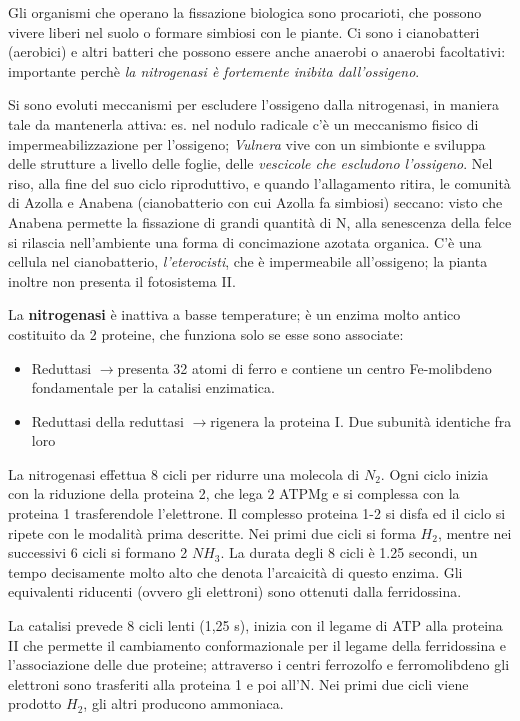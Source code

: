 \documentclass[a4paper,12pt]{book}
\newcommand{\lfreccia}{\ensuremath{\longrightarrow}}
\begin{document}
Gli organismi che operano la fissazione biologica sono procarioti, che possono vivere liberi nel suolo o formare simbiosi con le piante. Ci sono i cianobatteri (aerobici) e altri batteri che possono essere anche anaerobi o anaerobi facoltativi: importante perchè \emph{la nitrogenasi è fortemente inibita dall'ossigeno}. 

Si sono evoluti meccanismi per escludere l'ossigeno dalla nitrogenasi, in maniera tale da mantenerla attiva: es. nel nodulo radicale c'è un meccanismo fisico di impermeabilizzazione per l'ossigeno; \emph{Vulnera} vive con un simbionte e sviluppa delle strutture a livello delle foglie, delle \emph{vescicole che escludono l'ossigeno}.
Nel riso, alla fine del suo ciclo riproduttivo, e quando l'allagamento ritira, le comunità di Azolla e Anabena (cianobatterio con cui Azolla fa simbiosi) seccano: visto che Anabena permette la fissazione di grandi quantità di N, alla senescenza della felce si rilascia nell'ambiente una forma di concimazione azotata organica. C'è una cellula nel cianobatterio, \emph{l'eterocisti}, che è impermeabile all'ossigeno; la pianta inoltre non presenta il fotosistema II.

La \textbf{nitrogenasi} è inattiva a basse temperature; è un enzima molto antico costituito da 2 proteine, che funziona solo se esse sono associate:
\begin{itemize}
    \item{Reduttasi \lfreccia presenta 32 atomi di ferro e contiene un centro Fe-molibdeno fondamentale per la catalisi enzimatica.}
    \item{Reduttasi della reduttasi \lfreccia rigenera la proteina I. Due subunità identiche fra loro }
    \end{itemize}
    La nitrogenasi effettua 8 cicli per ridurre una molecola di $N_{2}$. Ogni ciclo inizia con la riduzione della proteina 2, che lega 2 ATPMg e si complessa con la proteina 1 trasferendole l’elettrone. Il complesso proteina 1-2 si disfa ed il ciclo si ripete con le modalità prima descritte. Nei primi due cicli si forma $H_{2}$, mentre nei successivi 6 cicli si formano 2 $NH_{3}$. La durata degli 8 cicli è 1.25 secondi, un tempo decisamente molto alto che denota l’arcaicità di questo enzima. Gli equivalenti riducenti (ovvero gli elettroni) sono ottenuti dalla ferridossina.
    
La catalisi prevede 8 cicli lenti (1,25 s), inizia con il legame di ATP alla proteina II che permette il cambiamento conformazionale per il legame della ferridossina e l'associazione delle due proteine; attraverso i centri ferrozolfo e ferromolibdeno gli elettroni sono trasferiti alla proteina 1 e poi all'N. Nei primi due cicli viene prodotto $H_{2}$, gli altri producono ammoniaca.
\end{document}
